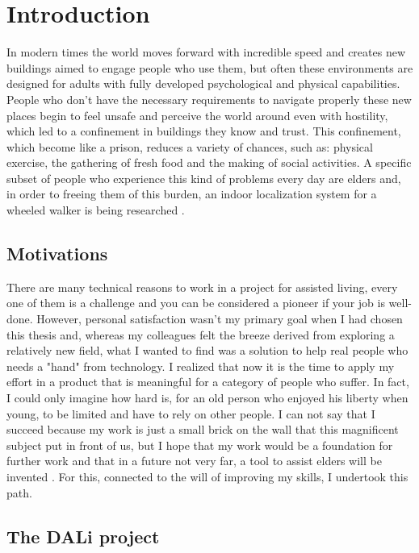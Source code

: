 \chapter{Introduction}
In modern times the world moves forward with incredible speed and creates new buildings aimed to engage people who use them, but often these environments are designed for adults with fully developed psychological and physical capabilities.
People who don't have the necessary requirements to navigate properly these new places begin to feel unsafe and perceive the world around even with hostility, which led to a confinement in buildings they know and trust.
This confinement, which become like a prison, reduces a variety of chances, such as: physical exercise, the gathering of fresh food and the making of social activities.
A specific subset of people who experience this kind of problems every day are elders and, in order to freeing them of this burden, an indoor localization system for a wheeled walker is being researched . 

\section{Motivations}

There are many technical reasons to work in a project for assisted living, every one of them is a challenge and you can be considered a pioneer if your job is well-done.
However, personal satisfaction wasn't my primary goal when I had chosen this thesis and, whereas my colleagues felt the breeze derived from exploring a relatively new field, what I wanted to find was a solution to help real people who needs a "hand" from technology.
I realized that now it is the time to apply my effort in a product that is meaningful for a category of people who suffer. 
In fact, I could only imagine how hard is, for an old person who enjoyed his liberty when young, to be limited and have to rely on other people.
I can not say that I succeed because my work is just a small brick on the wall that this magnificent subject put in front of us, but I hope that my work would be a foundation for further work and that in a future not very far, a tool to assist elders will be invented .
For this, connected to the will of improving my skills, I undertook this path.

\section{The DALi project}

